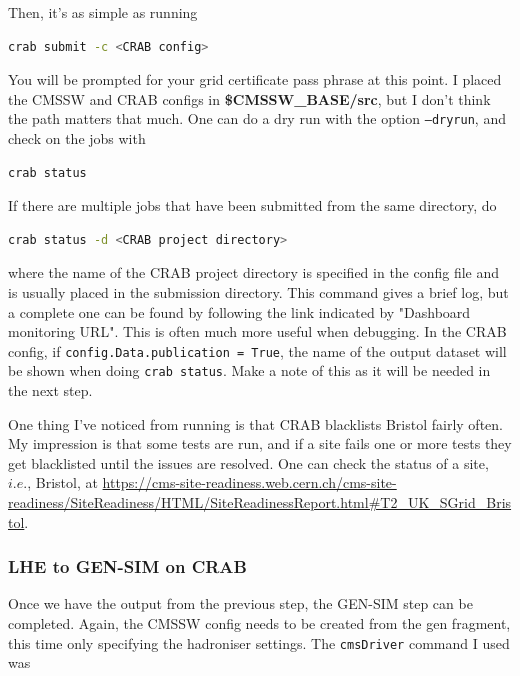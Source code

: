 Then, it's as simple as running

\begin{lstlisting}[belowskip=-0.7cm, language=sh, numbers=none]
crab submit -c <CRAB config>
\end{lstlisting}

You will be prompted for your grid certificate pass phrase at this point. I placed the CMSSW and CRAB configs in \textbf{\$CMSSW\_BASE/src}, but I don't think the path matters that much. One can do a dry run with the option \texttt{--dryrun}, and check on the jobs with

\begin{lstlisting}[belowskip=-0.7cm, language=sh, numbers=none]
crab status
\end{lstlisting}

If there are multiple jobs that have been submitted from the same directory, do

\begin{lstlisting}[belowskip=-0.7cm, language=sh, numbers=none]
crab status -d <CRAB project directory>
\end{lstlisting}

where the name of the CRAB project directory is specified in the config file and is usually placed in the submission directory. This command gives a brief log, but a complete one can be found by following the link indicated by "Dashboard monitoring URL". This is often much more useful when debugging. In the CRAB config, if \texttt{config.Data.publication = True}, the name of the output dataset will be shown when doing \texttt{crab status}. Make a note of this as it will be needed in the next step.

One thing I've noticed from running is that CRAB blacklists Bristol fairly often. My impression is that some tests are run, and if a site fails one or more tests they get blacklisted until the issues are resolved. One can check the status of a site, $i.e.$, Bristol, at \url{https://cms-site-readiness.web.cern.ch/cms-site-readiness/SiteReadiness/HTML/SiteReadinessReport.html#T2_UK_SGrid_Bristol}.


\subsubsection{LHE to GEN-SIM on CRAB}

Once we have the output from the previous step, the GEN-SIM step can be completed. Again, the CMSSW config needs to be created from the gen fragment, this time only specifying the hadroniser settings. The \texttt{cmsDriver} command I used was

